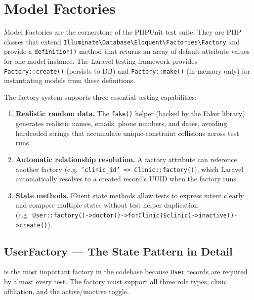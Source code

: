\section{Model Factories}
\label{sec:factories}

Model Factories are the cornerstone of the PHPUnit test suite. They are
PHP classes that extend
\texttt{Illuminate\textbackslash{}Database\textbackslash{}Eloquent\textbackslash{}Factories\textbackslash{}Factory}
and provide a \texttt{definition()} method that returns an array of
default attribute values for one model instance. The Laravel testing
framework provides \texttt{Factory::create()} (persists to DB) and
\texttt{Factory::make()} (in-memory only) for instantiating models from
these definitions.

The factory system supports three essential testing capabilities:

\begin{enumerate}
  \item \textbf{Realistic random data.} The \texttt{fake()} helper
    (backed by the Faker library) generates realistic names, emails,
    phone numbers, and dates, avoiding hardcoded strings that accumulate
    unique-constraint collisions across test runs.
  \item \textbf{Automatic relationship resolution.} A factory attribute
    can reference another factory (e.g.\ \texttt{'clinic\_id' =>
    Clinic::factory()}), which Laravel automatically resolves to a
    created record's UUID when the factory runs.
  \item \textbf{State methods.} Fluent state methods allow tests to
    express intent clearly and compose multiple states without test
    helper duplication (e.g.\
    \texttt{User::factory()->doctor()->forClinic(\$clinic)->inactive()->create()}).
\end{enumerate}

\subsection{UserFactory --- The State Pattern in Detail}
\label{sec:user-factory}

 is the most important factory in the codebase
because \texttt{User} records are required by almost every test. The
factory must support all three role types, clinic affiliation, and the
active/inactive toggle.

